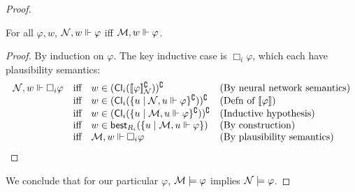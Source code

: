 \documentclass[letterpaper]{article}
\begin{document}
\begin{proof}
    \begin{claim*}
        For all $\varphi, w$, $\mathcal{N}, w \Vdash \varphi$ iff $\mathcal{M}, w \Vdash \varphi$.
    \end{claim*}
    \begin{proof}
        By induction on $\varphi$.  The key inductive case is $\Box_i \varphi$, which each have plausibility semantics:
        \[
        \begin{array}{lcll}
            \mathcal{N}, w \Vdash \Box_i \varphi & \mbox{iff} & w \in (\mathsf{Cl}_i([\![\mbox{\em $ \varphi $\/}]\!]_{\mathcal{N}}^\complement))^\complement & (\mbox{By neural network semantics}) \\
            & \mbox{iff} & w \in (\mathsf{Cl}_i(\{ u \mid \mathcal{N}, u \Vdash \varphi \}^\complement))^\complement & (\mbox{Defn of } [\![\mbox{\em $ \varphi $\/}]\!]) \\
            & \mbox{iff} & w \in (\mathsf{Cl}_i(\{ u \mid \mathcal{M}, u \Vdash \varphi \}^\complement))^\complement & (\mbox{Inductive hypothesis}) \\
            & \mbox{iff} & w \in \mathsf{best}_{R_i}(\{ u \mid \mathcal{M}, u \Vdash \varphi \}) & (\mbox{By construction}) \\
            & \mbox{iff} & \mathcal{M}, w \Vdash \Box_i \varphi & (\mbox{By plausibility semantics})
        \end{array}
        \]
    \end{proof}
    We conclude that for our particular $\varphi$, $\mathcal{M} \models \varphi$ implies $\mathcal{N} \models \varphi$.
\end{proof}


\end{document}
